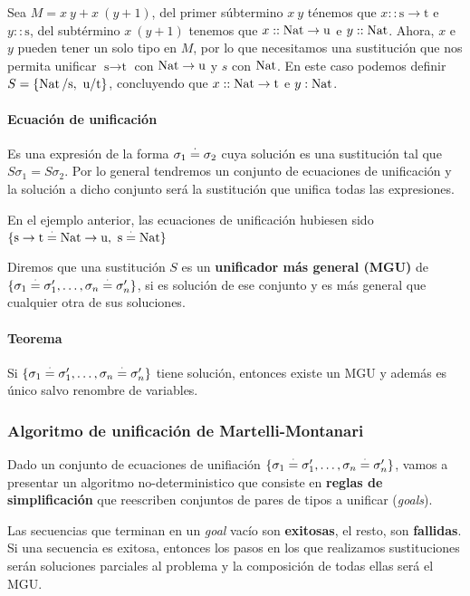 Sea $M = x~y + x~(y+1)$, del primer súbtermino $x~y$ ténemos que $x :: \text{s}\to \text{t}$ e $y :: \text{s}$, del subtérmino $x~(y+1)$ tenemos que $x::\operatorname{Nat}\to \text{u}$ e $y :: \operatorname{Nat}$. Ahora, $x$ e $y$ pueden tener un solo tipo en $M$, por lo que necesitamos una sustitución que nos permita unificar $\text{s}\to \text{t}$ con $\operatorname{Nat}\to \text{u}$ y $s$ con $\operatorname{Nat}$. En este caso podemos definir $S = \{\operatorname{Nat}/\text{s},~\text{u}/\text{t}\}$, concluyendo que $x :: \operatorname{Nat}\to\text{t}$ e $y:\operatorname{Nat}$.

\paragraph{Ecuación de unificación} Es una expresión de la forma $\sigma_1 \overset{\cdot}{=} \sigma_2$ cuya solución es una sustitución tal que $S\sigma_1 = S\sigma_2$. Por lo general tendremos un conjunto de ecuaciones de unificación y la solución a dicho conjunto será la sustitución que unifica todas las expresiones.

En el ejemplo anterior, las ecuaciones de unificación hubiesen sido $\{\text{s}\to\text{t}\overset{\cdot}{=} \operatorname{Nat}\to\text{u},~\text{s}\overset{\cdot}{=}\operatorname{Nat}\}$

Diremos que una sustitución $S$ es un \textbf{unificador más general (MGU)} de $\{\sigma_1 \overset{\cdot}{=} \sigma_1',\dots,\sigma_n \overset{\cdot}{=} \sigma_n'\}$, si es solución de ese conjunto y es más general que cualquier otra de sus soluciones.



\paragraph{Teorema} Si $\{\sigma_1 \overset{\cdot}{=} \sigma_1',\dots,\sigma_n \overset{\cdot}{=} \sigma_n'\}$ tiene solución, entonces existe un MGU y además es único salvo renombre de variables.

\subsubsection{Algoritmo de unificación de Martelli-Montanari}

Dado un conjunto de ecuaciones de unifiación $\{\sigma_1 \overset{\cdot}{=} \sigma_1',\dots,\sigma_n \overset{\cdot}{=} \sigma_n'\}$, vamos a presentar un algoritmo no-deterministico que consiste en \textbf{reglas de simplificación} que reescriben conjuntos de pares de tipos a unificar (\textit{goals}).

Las secuencias que terminan en un \textit{goal} vacío son \textbf{exitosas}, el resto, son \textbf{fallidas}. Si una secuencia es exitosa, entonces los pasos en los que realizamos sustituciones serán soluciones parciales al problema y la composición de todas ellas será el MGU.

